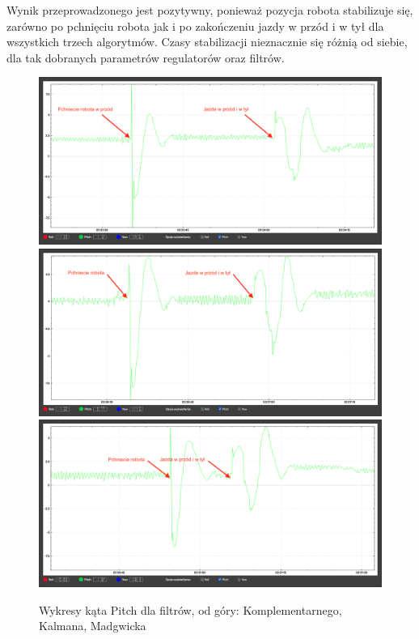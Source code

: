 Wynik przeprowadzonego jest pozytywny, ponieważ pozycja robota stabilizuje się, zarówno po pchnięciu robota jak i po zakończeniu jazdy w przód i w tył dla wszystkich trzech algorytmów. Czasy stabilizacji nieznacznie się różnią od siebie, dla tak dobranych parametrów regulatorów oraz filtrów.
 
\begin{figure}[h!]
    \centering
    \includegraphics[width=1\textwidth]{Rysunki/Rozdzial07/Komplementarny_jazda.png}
    \includegraphics[width=1\textwidth]{Rysunki/Rozdzial07/Kalman_jazda.png}
    \includegraphics[width=1\textwidth]{Rysunki/Rozdzial07/Madgwick_jazda.png}
    \caption{Wykresy kąta Pitch dla filtrów, od góry: Komplementarnego, Kalmana, Madgwicka}
    \label{Wykresy filtry test}
\end{figure}

